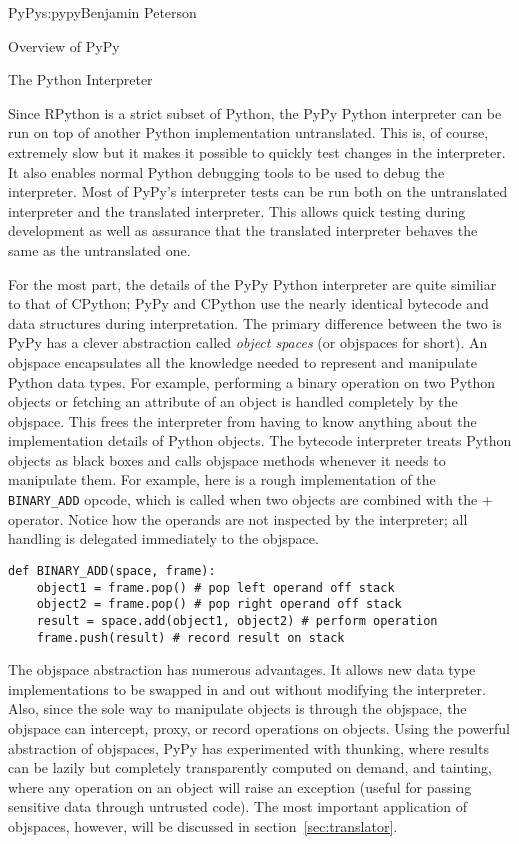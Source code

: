 \begin{aosachapter}{PyPy}{s:pypy}{Benjamin Peterson}
\begin{aosasect1}{Overview of PyPy}
\end{aosasect1}

\begin{aosasect1}{The Python Interpreter}

Since RPython is a strict subset of Python, the PyPy Python interpreter can be
run on top of another Python implementation untranslated. This is, of course,
extremely slow but it makes it possible to quickly test changes in the
interpreter. It also enables normal Python debugging tools to be used to debug
the interpreter. Most of PyPy's interpreter tests can be run both on the
untranslated interpreter and the translated interpreter. This allows quick
testing during development as well as assurance that the translated interpreter
behaves the same as the untranslated one.

For the most part, the details of the PyPy Python interpreter are quite similiar
to that of CPython; PyPy and CPython use the nearly identical bytecode and data
structures during interpretation. The primary difference between the two is PyPy
has a clever abstraction called \emph{object spaces} (or objspaces for
short). An objspace encapsulates all the knowledge needed to represent and
manipulate Python data types. For example, performing a binary operation on two
Python objects or fetching an attribute of an object is handled completely by
the objspace. This frees the interpreter from having to know anything about the
implementation details of Python objects. The bytecode interpreter treats Python
objects as black boxes and calls objspace methods whenever it needs to
manipulate them. For example, here is a rough implementation of the
\verb+BINARY_ADD+ opcode, which is called when two objects are combined with the
+ operator. Notice how the operands are not inspected by the interpreter; all
handling is delegated immediately to the objspace.

\begin{verbatim}
def BINARY_ADD(space, frame):
    object1 = frame.pop() # pop left operand off stack
    object2 = frame.pop() # pop right operand off stack
    result = space.add(object1, object2) # perform operation
    frame.push(result) # record result on stack
\end{verbatim}

The objspace abstraction has numerous advantages. It allows new data type
implementations to be swapped in and out without modifying the
interpreter. Also, since the sole way to manipulate objects is through the
objspace, the objspace can intercept, proxy, or record operations on
objects. Using the powerful abstraction of objspaces, PyPy has experimented with
thunking, where results can be lazily but completely transparently computed on
demand, and tainting, where any operation on an object will raise an exception
(useful for passing sensitive data through untrusted code). The most important
application of objspaces, however, will be discussed in
section~\ref{sec:translator}.


\end{aosasect1}
\end{aosachapter}
